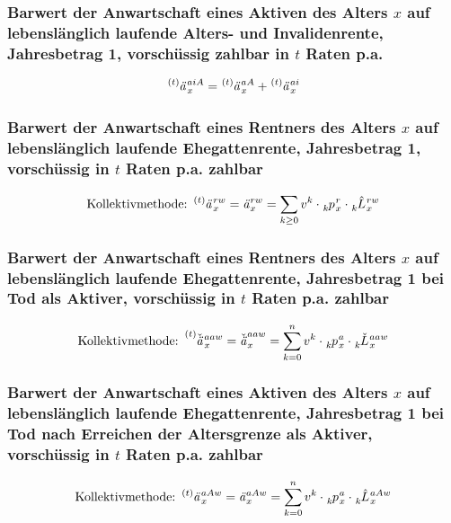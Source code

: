 \documentclass[12pt]{report}
\theoremstyle{dotless}
\theoremstyle{definition}
\begin{document}
\subsubsection{Barwert der Anwartschaft eines Aktiven des Alters $x$ auf lebenslänglich laufende Alters- und Invalidenrente, Jahresbetrag 1, vorschüssig zahlbar in $t$ Raten p.a.}
\begin{equation}
	\tensor[^{(t)}]{\text{\textit{ä}}}{}_x^{aiA} = \tensor[^{(t)}]{\text{\textit{ä}}}{}_x^{aA} +\tensor[^{(t)}]{\text{\textit{ä}}}{}_x^{ai}
\end{equation}

\subsubsection{Barwert der Anwartschaft eines Rentners des Alters $x$ auf lebenslänglich laufende Ehegattenrente, Jahresbetrag 1, vorschüssig in $t$ Raten p.a. zahlbar}
\begin{equation}
	\text{Kollektivmethode: } \tensor[^{(t)}]{\text{\textit{ä}}}{}_x^{rw}=\text{\textit{ä}}_x^{rw}=\sum_{k \geq 0} v^k \cdot \tensor[_{k}]{p}{}_x^r \cdot  \tensor[_{k}]{\hat{L}}{}_x^{rw}
\end{equation}

\subsubsection{Barwert der Anwartschaft eines Rentners des Alters $x$ auf lebenslänglich laufende Ehegattenrente, Jahresbetrag 1 bei Tod als Aktiver, vorschüssig in $t$ Raten p.a. zahlbar}
\begin{equation}
	\text{Kollektivmethode: } \tensor[^{(t)}]{\check{\text{\textit{ä}}}}{}_x^{aaw}=\check{\text{\textit{ä}}}_x^{aaw}=\sum_{k = 0}^n v^k \cdot \tensor[_{k}]{p}{}_x^a \cdot  \tensor[_{k}]{\check{L}}{}_x^{aaw}
\end{equation}

\subsubsection{Barwert der Anwartschaft eines Aktiven des Alters $x$ auf lebenslänglich laufende Ehegattenrente, Jahresbetrag 1 bei Tod nach Erreichen der Altersgrenze als Aktiver, vorschüssig in $t$ Raten p.a. zahlbar}
\begin{equation}
	\text{Kollektivmethode: } \tensor[^{(t)}]{\text{\textit{ä}}}{}_x^{aAw}=\text{\textit{ä}}_x^{aAw}=\sum_{k = 0}^n v^k \cdot \tensor[_{k}]{p}{}_x^a \cdot \tensor[_{k}]{\hat{L}}{}_x^{aAw}
\end{equation}
\end{document}
